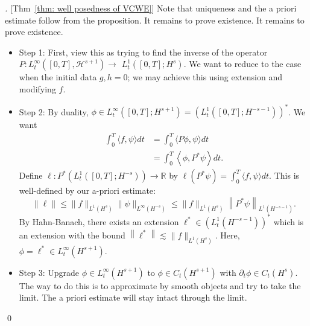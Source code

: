 \vspace{2em}
\begin{proof}[][Thm~\ref{thm: well posedness of VCWE}]
Note that uniqueness and the a priori estimate follow from the proposition. It remains to prove existence. It remains to prove existence. 
\begin{itemize}
    \item Step 1: First, view this as trying to find the inverse of the operator $P: L_{t}^{\infty}\left([0, T], \mathcal{H}^{s+1}\right) \rightarrow$ $L_{t}^{1}\left([0, T] ; H^{s}\right)$. We want to reduce to the case when the initial data $g, h=0$; we may achieve this using extension and modifying $f$.
    \item Step 2: By duality, $\phi \in L_{t}^{\infty}\left([0, T] ; H^{s+1}\right)=\left(L_{t}^{1}\left([0, T] ; H^{-s-1}\right)\right)^{*}$. We want
    $$
    \begin{aligned}
    \int_{0}^{T}\langle f, \psi\rangle d t &=\int_{0}^{T}\langle P \phi, \psi\rangle d t \\
    &=\int_{0}^{T}\left\langle\phi, P^{*} \psi\right\rangle d t.
    \end{aligned}
    $$
    Define $\ell: P^{*}\left(L_{t}^{1}\left([0, T] ; H^{-s}\right)\right) \rightarrow \mathbb{R}$ by $\ell\left(P^{*} \psi\right)=\int_{0}^{T}\langle f, \psi\rangle d t$. This is well-defined by our a-priori estimate:
    $$
    \|\ell\| \leq\|f\|_{L^{1}\left(H^{s}\right)}\|\psi\|_{L^{\infty}\left(H^{-s}\right)} \leq\|f\|_{L^{1}\left(H^{s}\right)}\left\|P^{*} \psi\right\|_{L^{1}\left(H^{-s-1}\right)} .
    $$
    By Hahn-Banach, there exists an extension $\ell^{*} \in\left(L_{t}^{1}\left(H^{-s-1}\right)\right)^{*}$ which is an extension with the bound $\left\|\ell^{*}\right\| \lesssim\|f\|_{L^{1}\left(H^{s}\right)}$. Here, $\phi=\ell^{*} \in L_{t}^{\infty}\left(H^{s+1}\right)$.
    \item Step 3: Upgrade $\phi \in L_{t}^{\infty}\left(H^{s+1}\right)$ to $\phi \in C_{t}\left(H^{s+1}\right)$ with $\partial_{t} \phi \in C_{t}\left(H^{s}\right)$. The way to do this is to approximate by smooth objects and try to take the limit. The a priori estimate will stay intact through the limit.
\end{itemize}
\qed
\end{proof}
